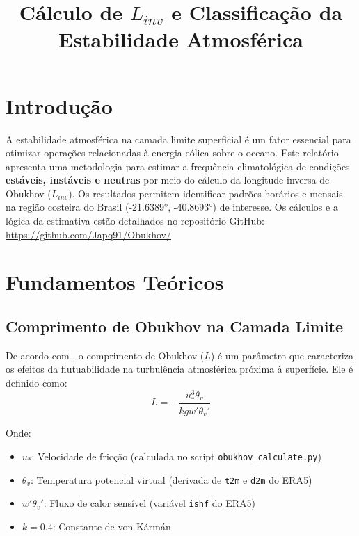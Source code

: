 \documentclass[12pt]{article}
\title{Cálculo de $L_{inv}$ e Classificação da Estabilidade Atmosférica}
\author{}
\date{}
\begin{document}
\maketitle

\section{Introdução}
A estabilidade atmosférica na camada limite superficial é um fator essencial para otimizar operações relacionadas à energia eólica sobre o oceano. Este relatório apresenta uma metodologia para estimar a frequência climatológica de condições \textbf{estáveis, instáveis e neutras} por meio do cálculo da longitude inversa de Obukhov (\(L_{inv}\)). Os resultados permitem identificar padrões horários e mensais na região costeira do Brasil (-21.6389°, -40.8693°) de interesse. Os cálculos e a lógica da estimativa estão detalhados no repositório GitHub: \url{https://github.com/Japq91/Obukhov/}
\section{Fundamentos Teóricos}

\subsection{Comprimento de Obukhov na Camada Limite}
De acordo com \citep{ecmwf_ifs_cy49r1_physics}, o comprimento de Obukhov ($L$) é um parâmetro que caracteriza os efeitos da flutuabilidade na turbulência atmosférica próxima à superfície. Ele é definido como:
\begin{equation}
L = -\frac{u_*^3 \theta_v}{k g \overline{w'\theta_v'}}
\end{equation}

Onde:
\begin{itemize}
    \item $u_*$: Velocidade de fricção (calculada no script \texttt{obukhov\_calculate.py})
    \item $\theta_v$: Temperatura potencial virtual (derivada de \texttt{t2m} e \texttt{d2m} do ERA5)
    \item $\overline{w'\theta_v'}$: Fluxo de calor sensível (variável \texttt{ishf} do ERA5)
    \item $k = 0.4$: Constante de von Kármán
\end{itemize}
\end{document}

